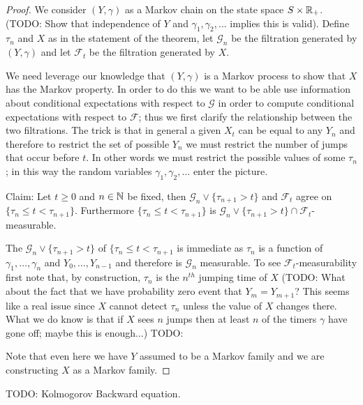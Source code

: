 \begin{proof}
We consider $(Y, \gamma)$ as a Markov chain on the state space $S
\times \mathbb{R}_+$.  (TODO: Show that independence of $Y$ and $\gamma_1,
\gamma_2, \dotsc$ implies this is valid).  Define $\tau_n$ and $X$ as
in the statement of the theorem, let $\mathcal{G}_n$ be the filtration
generated by $(Y, \gamma)$ and let $\mathcal{F}_t$ be the filtration
generated by $X$.

We need leverage our knowledge that $(Y,\gamma)$ is a Markov process
to show that $X$ has the Markov property.  In order to do this we want
to be able use information about conditional expectations with respect
to $\mathcal{G}$ in order to compute conditional expectations with
respect to $\mathcal{F}$; thus we first clarify the relationship
between the two filtrations.  The trick is that in general a given
$X_t$ can be equal to any $Y_n$ and therefore to restrict the set of
possible $Y_n$ we must restrict the number of jumps that occur before
$t$.  In other words we must restrict the possible values of some
$\tau_n$; in this way the random variables $\gamma_1, \gamma_2,
\dotsc$ enter the picture.

Claim: Let $t \geq 0$ and $n \in \mathbb{N}$ be fixed, then
$\mathcal{G}_n \vee \lbrace \tau_{n+1} > t \rbrace$ and
$\mathcal{F}_t$ agree on $\lbrace \tau_n \leq t < \tau_{n+1}\rbrace$.
Furthermore $\lbrace \tau_n \leq t < \tau_{n+1}\rbrace$ is
$\mathcal{G}_n \vee \lbrace \tau_{n+1} > t\rbrace\cap \mathcal{F}_t$-measurable.

The $\mathcal{G}_n \vee \lbrace \tau_{n+1} > t \rbrace$ of $\lbrace
\tau_n \leq t < \tau_{n+1}$ is immediate as $\tau_n$ is a function of
$\gamma_1, \dotsc, \gamma_n$ and $Y_0, \dotsc, Y_{n-1}$ and therefore is
$\mathcal{G}_n$ measurable.  To see $\mathcal{F}_t$-measurability
first note that, by construction, $\tau_n$ is the $n^{th}$ jumping
time of $X$ (TODO: What about the fact that we have probability zero
event that $Y_m = Y_{m+1}$?  This seems like a real issue since $X$
cannot detect $\tau_n$ unless the value of $X$ changes there.  What we
do know is that if $X$ sees $n$ jumps then at least $n$ of the timers
$\gamma$ have gone off; maybe this is enough...)
TODO:

Note that even here we have $Y$ assumed to be a Markov family and we
are constructing $X$ as a Markov family.
\end{proof}

TODO: Kolmogorov Backward equation.


